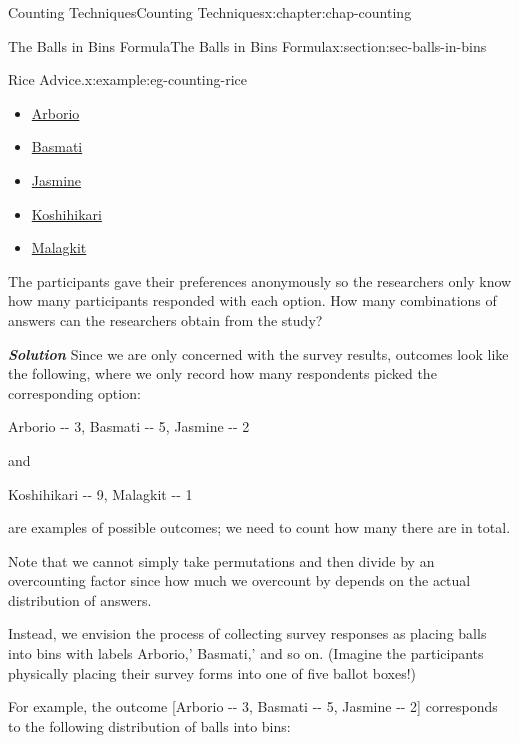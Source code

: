 \documentclass[oneside,10pt,]{book}
\newcommand{\alert}[1]{\textbf{\textit{#1}}}
\numberwithin{equation}{section}
\begin{document}
\begin{chapterptx}{Counting Techniques}{}{Counting Techniques}{}{}{x:chapter:chap-counting}
\begin{sectionptx}{The Balls in Bins Formula}{}{The Balls in Bins Formula}{}{}{x:section:sec-balls-in-bins}
\begin{example}{Rice Advice.}{x:example:eg-counting-rice}
\begin{itemize}[label=\textbullet]
\item{}\href{https://en.wikipedia.org/wiki/Arborio_rice}{Arborio}%
\item{}\href{https://en.wikipedia.org/wiki/Basmati}{Basmati}%
\item{}\href{https://en.wikipedia.org/wiki/Jasmine_rice}{Jasmine}%
\item{}\href{https://en.wikipedia.org/wiki/Koshihikari}{Koshihikari}%
\item{}\href{https://en.wikipedia.org/wiki/Glutinous_rice}{Malagkit}%
\end{itemize}
The participants gave their preferences anonymously so the researchers only know how many participants responded with each option. How many combinations of answers can the researchers obtain from the study?%
\par
\alert{Solution} Since we are only concerned with the survey results, outcomes look like the following, where we only record how many respondents picked the corresponding option:%
\begin{sidebyside}{1}{0.125}{0.125}{0}%
\begin{sbspanel}{0.75}%
Arborio -{}-{} 3, Basmati -{}-{} 5, Jasmine -{}-{} 2%
\end{sbspanel}%
\end{sidebyside}%
\par
and%
\begin{sidebyside}{1}{0.125}{0.125}{0}%
\begin{sbspanel}{0.75}%
Koshihikari -{}-{} 9, Malagkit -{}-{} 1%
\end{sbspanel}%
\end{sidebyside}%
\par
are examples of possible outcomes; we need to count how many there are in total.%
\par
Note that we cannot simply take permutations and then divide by an overcounting factor since how much we overcount by depends on the actual distribution of answers.%
\par
Instead, we envision the process of collecting survey responses as placing balls into bins with labels \textasciigrave{}Arborio,' \textasciigrave{}Basmati,' and so on. (Imagine the participants physically placing their survey forms into one of five ballot boxes!)%
\par
For example, the outcome [Arborio -{}-{} 3, Basmati -{}-{} 5, Jasmine -{}-{} 2] corresponds to the following distribution of balls into bins:%
\begin{sidebyside}{1}{0.05}{0.05}{0}%
\begin{sbspanel}{0.9}%

\end{sbspanel}
\end{sidebyside}
\end{example}
\end{sectionptx}
\end{chapterptx}
\end{document}
